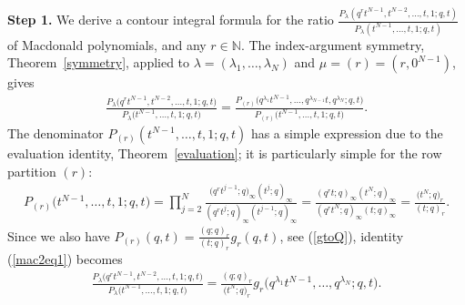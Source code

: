 \documentclass[11pt]{article}
\numberwithin{equation}{section}
\newcommand{\N}{\mathbb{N}}
\begin{document}
\textbf{Step 1.} We derive a contour integral formula for the ratio $\frac{P_{\lambda}(q^rt^{N-1}, t^{N-2}, \dots, t, 1; q, t)}{P_{\lambda}(t^{N-1}, \dots, t, 1; q, t)}$ of Macdonald polynomials, and any $r\in\N$. The index-argument symmetry, Theorem~\ref{symmetry}, applied to $\lambda = (\lambda_1, \dots, \lambda_N)$ and $\mu = (r) = (r, 0^{N-1})$, gives
\begin{gather}\label{mac2eq1}
\frac{P_{\lambda}\big(q^rt^{N-1}, t^{N-2}, \dots, t, 1; q, t\big)}{P_{\lambda}\big(t^{N-1}, \dots, t, 1; q, t\big)} = \frac{P_{(r)}\big(q^{\lambda_1}t^{N-1}, \dots, q^{\lambda_{N-1}}t, q^{\lambda_N}; q, t\big)}{P_{(r)}\big(t^{N-1}, \dots, t, 1; q, t\big)}.
\end{gather}
The denominator $P_{(r)}(t^{N-1}, \dots, t, 1; q, t)$ has a simple expression due to the evaluation identity, Theorem~\ref{evaluation}; it is particularly simple for the row partition $(r)$:
\begin{gather*}
P_{(r)}\big(t^{N-1}, \dots, t, 1; q, t\big) = \prod_{j=2}^N{\frac{\big(q^{r}t^{j-1}; q\big)_{\infty}(t^j; q)_{\infty}}{(q^rt^j; q)_{\infty}(t^{j-1}; q)_{\infty}}} = {\frac{(q^rt; q)_{\infty}(t^N; q)_{\infty}}{(q^rt^N; q)_{\infty}(t; q)_{\infty}}} = \frac{\big(t^N; q\big)_r}{(t; q)_r}.
\end{gather*}
Since we also have $P_{(r)}(q, t) = \frac{(q; q)_r}{(t; q)_r}g_r(q, t)$, see (\ref{gtoQ}), identity (\ref{mac2eq1}) becomes
\begin{gather}\label{mac2eq0}
\frac{P_{\lambda}\big(q^rt^{N-1}, t^{N-2}, \dots, t, 1; q, t\big)}{P_{\lambda}\big(t^{N-1}, \dots, t, 1; q, t\big)} = \frac{(q; q)_r}{\big(t^N; q\big)_r} g_r\big(q^{\lambda_1}t^{N-1}, \dots, q^{\lambda_N}; q, t\big).
\end{gather}
\end{document}
